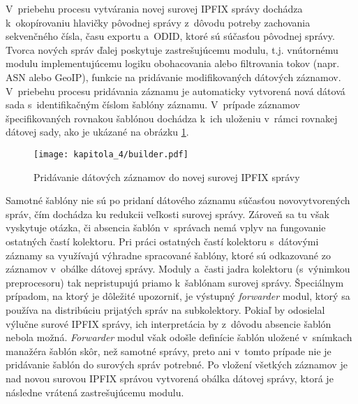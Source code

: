 V~priebehu procesu vytvárania novej surovej IPFIX správy dochádza k~okopírovaniu hlavičky pôvodnej správy z~dôvodu potreby zachovania sekvenčného čísla, času exportu a~ODID, ktoré sú súčasťou pôvodnej správy. Tvorca nových správ ďalej poskytuje
zastrešujúcemu modulu, t.j. vnútornému modulu implementujúcemu logiku obohacovania alebo filtrovania tokov (napr. ASN alebo GeoIP), funkcie na pridávanie modifikovaných dátových záznamov. V~priebehu procesu pridávania záznamu je automaticky vytvorená nová dátová sada
s~identifikačným číslom šablóny záznamu. V~prípade záznamov špecifikovaných rovnakou šablónou dochádza k~ich uloženiu v~rámci rovnakej dátovej sady, ako je ukázané na obrázku \ref{fig:builder}.

\begin{figure}[ht]
    \centering
    \texttt{[image: kapitola\_4/builder.pdf]}
    \caption{Pridávanie dátových záznamov do novej surovej IPFIX správy}
    \label{fig:builder}
\end{figure}

Samotné šablóny nie sú po pridaní dátového záznamu súčasťou novovytvorených správ, čím dochádza ku redukcii veľkosti surovej správy. Zároveň sa tu však vyskytuje otázka, či absencia šablón v~správach nemá vplyv na fungovanie ostatných častí kolektoru. Pri práci ostatných častí
kolektoru s~dátovými záznamy sa využívajú výhradne spracované šablóny, ktoré sú odkazované zo záznamov v~obálke dátovej správy. Moduly a~časti jadra kolektoru (s~výnimkou preprocesoru) tak nepristupujú priamo k~šablónam surovej správy. Špeciálnym prípadom, na ktorý je dôležité upozorniť, je výstupný
\textit{forwarder} modul, ktorý sa používa na distribúciu prijatých správ na subkolektory. Pokiaľ by odosielal výlučne surové IPFIX správy, ich interpretácia by z~dôvodu absencie šablón nebola možná. \textit{Forwarder} modul však odošle definície šablón uložené v~snímkach manažéra šablón skôr,
než samotné správy, preto ani v~tomto prípade nie je pridávanie šablón do surových správ potrebné. Po vložení všetkých záznamov je nad novou surovou IPFIX správou vytvorená obálka dátovej správy, ktorá je následne vrátená zastrešujúcemu modulu.

